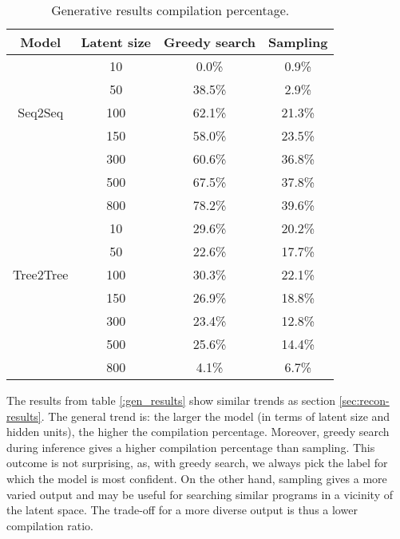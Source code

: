 \begin{table}[ht!]
\centering
\begingroup
\setlength{\tabcolsep}{3pt} %
\renewcommand{\arraystretch}{1.4} %
\begin{tabular}{cccc}
\textbf{Model}   & \textbf{Latent size} & \textbf{Greedy search} & \textbf{Sampling} \\ \hline
\multirow{5}{*}{Seq2Seq}    &   10   &  0.0\%   & 0.9\%  \\
                            &   50   &   38.5\%    &  2.9\%   \\
                            &   100   &   62.1\%   &  21.3\%     \\
                            &   150   &   58.0\%  &     23.5\%        \\
                            &   300   &  60.6\%  &  36.8\%   \\   
                            &   500   &  67.5\% & 37.8\% \\
                            &   800   & 78.2\%  & 39.6\% \\\hline
\multirow{5}{*}{Tree2Tree}  &   10   &   29.6\%   & 20.2\% \\
                            &   50    & 22.6\%   &  17.7\%    \\
                            &   100    & 30.3\%  &       22.1\%      \\
                            &   150  &  26.9\%  &   18.8\%     \\
                            &   300  & 23.4\%  & 12.8\%    \\   
                            &   500 & 25.6\%  & 14.4\%\\
                            &   800   &  4.1\% & 6.7\% \\
\end{tabular}
\endgroup
\caption{Generative results compilation percentage.}
\label{tab:gen_results}
\end{table}




The results from table \ref{:gen_results} show similar trends as section \ref{sec:recon-results}. The general trend is: the larger the model (in terms of latent size and hidden units), the higher the compilation percentage. Moreover, greedy search during inference gives a higher compilation percentage than sampling. This outcome is not surprising, as, with greedy search, we always pick the label for which the model is most confident. On the other hand, sampling gives a more varied output and may be useful for searching similar programs in a vicinity of the latent space. The trade-off for a more diverse output is thus a lower compilation ratio. 


